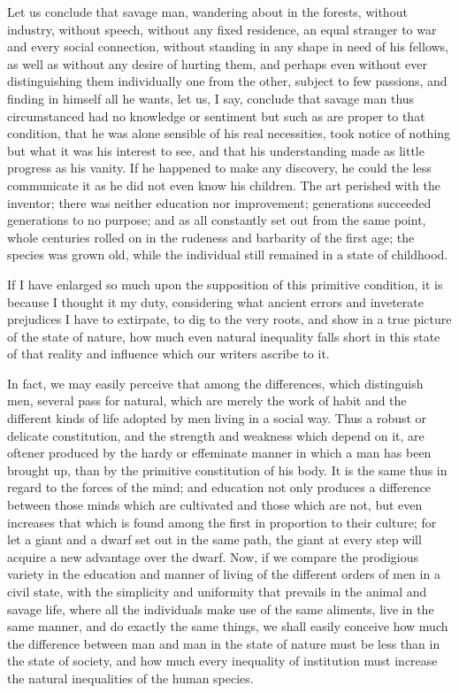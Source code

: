 \documentclass[11pt,twocolumn]{ltugboat}
\begin{document}
Let us conclude that savage man, wandering about in the forests,
without industry, without speech, without any fixed residence, an
equal stranger to war and every social connection, without standing in
any shape in need of his fellows, as well as without any desire of
hurting them, and perhaps even without ever distinguishing them
individually one from the other, subject to few passions, and finding
in himself all he wants, let us, I say, conclude that savage man thus
circumstanced had no knowledge or sentiment but such as are proper to
that condition, that he was alone sensible of his real necessities,
took notice of nothing but what it was his interest to see, and that
his understanding made as little progress as his vanity. If he
happened to make any discovery, he could the less communicate it as he
did not even know his children. The art perished with the inventor;
there was neither education nor improvement; generations succeeded
generations to no purpose; and as all constantly set out from the same
point, whole centuries rolled on in the rudeness and barbarity of the
first age; the species was grown old, while the individual still
remained in a state of childhood.

If I have enlarged so much upon the supposition of this primitive
condition, it is because I thought it my duty, considering what
ancient errors and inveterate prejudices I have to extirpate, to dig
to the very roots, and show in a true picture of the state of nature,
how much even natural inequality falls short in this state of that
reality and influence which our writers ascribe to it.

In fact, we may easily perceive that among the differences, which
distinguish men, several pass for natural, which are merely the work
of habit and the different kinds of life adopted by men living in a
social way. Thus a robust or delicate constitution, and the strength
and weakness which depend on it, are oftener produced by the hardy or
effeminate manner in which a man has been brought up, than by the
primitive constitution of his body. It is the same thus in regard to
the forces of the mind; and education not only produces a difference
between those minds which are cultivated and those which are not, but
even increases that which is found among the first in proportion to
their culture; for let a giant and a dwarf set out in the same path,
the giant at every step will acquire a new advantage over the dwarf.
Now, if we compare the prodigious variety in the education and manner
of living of the different orders of men in a civil state, with the
simplicity and uniformity that prevails in the animal and savage life,
where all the individuals make use of the same aliments, live in the
same manner, and do exactly the same things, we shall easily conceive
how much the difference between man and man in the state of nature
must be less than in the state of society, and how much every
inequality of institution must increase the natural inequalities of
the human species.
\end{document}
